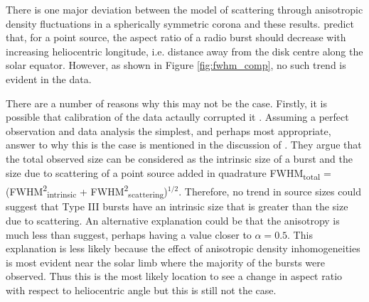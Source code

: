 There is one major deviation between the model of scattering through anisotropic density fluctuations in a spherically symmetric corona and these results. \cite{Kontar2019} predict that, for a point source, the aspect ratio of a radio burst should decrease with increasing heliocentric longitude, i.e. distance away from the disk centre along the solar equator. However, as shown in Figure \ref{fig:fwhm_comp}, no such trend is evident in the data.  

There are a number of reasons why this may not be the case. Firstly, it is possible that calibration of the data actaully corrupted it . Assuming a perfect observation and data analysis the simplest, and perhaps most appropriate, answer to why this is the case is mentioned in the discussion of \cite{Kontar2019}. They argue that the total observed size can be considered as the intrinsic size of a burst and the size due to scattering of a point source added in quadrature FWHM\textsubscript{total} = (FWHM\textsuperscript{2}\textsubscript{intrinsic} + FWHM\textsuperscript{2}\textsubscript{scattering})$^{1/2}$. Therefore, no trend in source sizes could suggest that Type III bursts have an intrinsic size that is greater than the size due to scattering. An alternative explanation could be that the anisotropy is much less than \cite{Kontar2019} suggest, perhaps having a value closer to $\alpha = 0.5$. This explanation is less likely because the effect of anisotropic density inhomogeneities is most evident near the solar limb where the majority of the bursts were observed. Thus this is the most likely location to see a change in aspect ratio with respect to heliocentric angle but this is still not the case.


